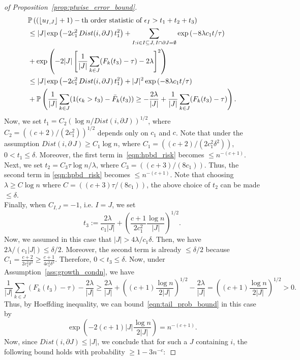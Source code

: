 \documentclass[11pt]{article}
\newcommand{\bP}{\mathbb{P}}
\theoremstyle{plain}
\theoremstyle{definition}
\theoremstyle{remark}
\begin{document}
\begin{appendix}
\begin{proof}[of Proposition~\ref{prop:ptwise_error_bound}]
\begin{align}\label{eqn:hpbd_risk}
    &\bP\left((\lfloor u_{I,J}\rfloor+1)-\text{th order statistic of }\epsilon_I>t_1+t_2+t_3\right)\nonumber\\
    &\leq |J| \exp{\left(-2c_1^2\,Dist(i,\partial J)\,t_1^2\right)}+\sum_{I:i\in I\subseteq J,\,I\cap \partial J= \emptyset}\exp{\left(-8\lambda c_1t/\tau\right)}\nonumber\allowdisplaybreaks\\
    &+\exp{\left(-2|J|\left[\frac{1}{|J|}\sum_{k \in J} (F_k(t_3)-\tau)-2\lambda\right]^2\right)}\nonumber\\
    &\leq |J| \exp{\left(-2c_1^2\,Dist(i,\partial J)\,t_1^2\right)}+|J|^2\exp{\left(-8\lambda c_1t/\tau\right)}\nonumber\\
    &+\bP\left(\frac{1}{|J|}\sum_{k \in J} (1(\epsilon_k>t_3)-\Bar{F}_k(t_3))\geq -\frac{2\lambda}{|J|} +\frac{1}{|J|}\sum_{k \in J} (F_k(t_3)-\tau)\right).
\end{align}
\noindent 
Now, we set $t_1=C_2 \left(\log n/Dist(i,\partial J)\right)^{1/2}$, where $C_2=\left((c+2)/(2c_1^2)\right)^{1/2}$ depends only on $c_1$ and $c$. Note that under the assumption $Dist(i,\partial\,J)\geq C_1 \log n$, where $C_1= \left((c+2)/(2c_1^2\delta^2)\right)$, $0<t_1\leq \delta$. Moreover, the first term in~\eqref{eqn:hpbd_risk} becomes \(\leq n^{-(c+1)}.\)\\
\noindent Next, we set $t_2=C_3\tau\log n/\lambda$, where $C_3=\left((c+3)/(8c_1)\right)$. Thus, the second term in \eqref{eqn:hpbd_risk} becomes \(\leq n^{-(c+1)}\). Note that choosing $\lambda \geq C \log n$ where $C=\left((c+3)\tau/(8c_1)\right)$, the above choice of $t_2$ can be made $\leq \delta.$\\
\noindent Finally, when $C_{I,J}=-1$, i.e. $I=J$, we set
\[t_3:=\frac{2\lambda}{c_1|J|}+\left(\frac{c+1}{2c_1^2}\frac{\log n}{ |J|}\right)^{1/2}.\]
Now, we assumed in this case  that \(|J|>4\lambda/c_1\delta\). Then, we have \(2\lambda/(c_1|J|)\leq \delta/2\). Moreover, the second term is already $\leq \delta/2$ because $C_1= \frac{c+2}{2c_1^2\delta^2}\geq \frac{c+1}{4c_1^2\delta^2}$. Therefore, $0<t_3\leq \delta$. Now, under Assumption~\ref{ass:growth_condn}, we have
    \[\frac{1}{|J|}\sum_{k \in J} (F_k(t_3)-\tau)-\frac{2\lambda}{|J|}\geq \frac{2\lambda}{|J|}+\left((c+1)\frac{\log n}{2|J|}\right)^{1/2}-\frac{2\lambda}{|J|}=\left((c+1)\frac{\log n}{2|J|}\right)^{1/2}>0.\]
    Thus, by Hoeffding inequality, we can bound~\eqref{eqn:tail_prob_bound} in this case by
\[\exp{\left(-2(c+1)|J|\frac{\log n}{2|J|}\right)}=n^{-(c+1)}.\]
 Now, since $Dist(i,\partial J)\leq |J|$,  we conclude that for such a $J$ containing $i$, the following bound holds with probability $\geq 1-3n^{-c}:$

\end{proof}
\end{appendix}
\end{document}
